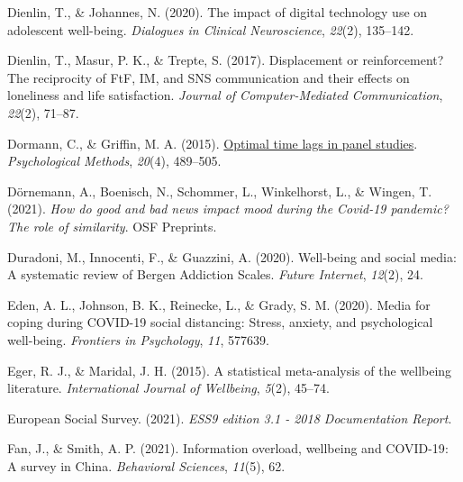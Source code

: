 \documentclass[
  man,mask,floatsintext]{apa7}
\newlength{\cslhangindent}
\newlength{\cslentryspacingunit} %
\newenvironment{CSLReferences}[2] %
 {%
  \setlength{\parindent}{0pt}
  \ifodd #1
  \let\oldpar\par
  \def\par{\hangindent=\cslhangindent\oldpar}
  \fi
  \setlength{\parskip}{#2\cslentryspacingunit}
 }%
 {}
\begin{document}
\begin{CSLReferences}{1}{0}
\leavevmode{}%
Dienlin, T., \& Johannes, N. (2020). The impact of digital technology use on adolescent well-being. \emph{Dialogues in Clinical Neuroscience}, \emph{22}(2), 135--142.

\leavevmode{}%
Dienlin, T., Masur, P. K., \& Trepte, S. (2017). Displacement or reinforcement? {The} reciprocity of {FtF}, {IM}, and {SNS} communication and their effects on loneliness and life satisfaction. \emph{Journal of Computer-Mediated Communication}, \emph{22}(2), 71--87.

\leavevmode{}%
Dormann, C., \& Griffin, M. A. (2015). \href{https://www.ncbi.nlm.nih.gov/pubmed/26322999}{Optimal time lags in panel studies}. \emph{Psychological Methods}, \emph{20}(4), 489--505.

\leavevmode{}%
Dörnemann, A., Boenisch, N., Schommer, L., Winkelhorst, L., \& Wingen, T. (2021). \emph{How do good and bad news impact mood during the {Covid-19} pandemic? {The} role of similarity}. {OSF Preprints}.

\leavevmode{}%
Duradoni, M., Innocenti, F., \& Guazzini, A. (2020). Well-being and social media: {A} systematic review of {Bergen Addiction Scales}. \emph{Future Internet}, \emph{12}(2), 24.

\leavevmode{}%
Eden, A. L., Johnson, B. K., Reinecke, L., \& Grady, S. M. (2020). Media for coping during {COVID-19} social distancing: {Stress}, anxiety, and psychological well-being. \emph{Frontiers in Psychology}, \emph{11}, 577639.

\leavevmode{}%
Eger, R. J., \& Maridal, J. H. (2015). A statistical meta-analysis of the wellbeing literature. \emph{International Journal of Wellbeing}, \emph{5}(2), 45--74.

\leavevmode{}%
European Social Survey. (2021). \emph{{ESS9} edition 3.1 - 2018 {Documentation Report}}.

\leavevmode{}%
Fan, J., \& Smith, A. P. (2021). Information overload, wellbeing and {COVID-19}: {A} survey in {China}. \emph{Behavioral Sciences}, \emph{11}(5), 62.


\end{CSLReferences}
\end{document}
